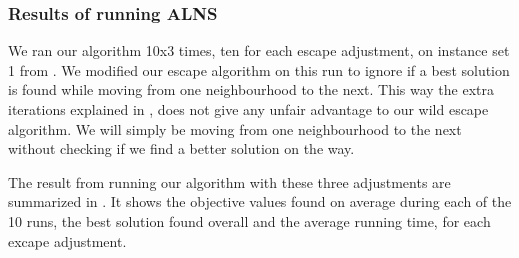 \documentclass[../main.tex]{subfiles}
\begin{document}
\subsubsection{Results of running ALNS}
We ran our algorithm 10x3 times, ten for each escape adjustment, on instance set 1 from .
We modified our escape algorithm on this run to ignore if a best solution is found while moving from one neighbourhood to the next. 
This way the extra iterations explained in , does not give any unfair advantage to our wild escape algorithm. We will simply be moving from one neighbourhood to the next without checking if we find a better solution on the way.
\par
The result from running our algorithm with these three adjustments are summarized in .
It shows the objective values found on average during each of the 10 runs, the best solution found overall and the average running time, for each excape adjustment.
\end{document}
